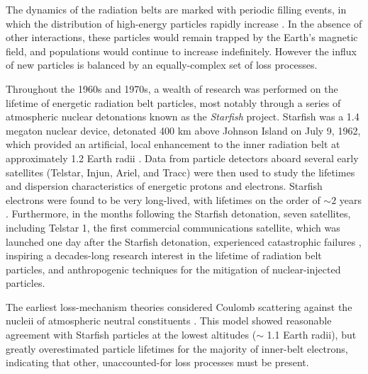 The dynamics of the radiation belts are marked with periodic filling events, in which the distribution of high-energy particles rapidly increase \citep{Horne2005, Baker2014}. In the absence of other interactions, these particles would remain trapped by the Earth's magnetic field, and populations would continue to increase indefinitely. However the influx of new particles is balanced by an equally-complex set of loss processes.

Throughout the 1960s and 1970s, a wealth of research was performed on the lifetime of energetic radiation belt particles, most notably through a series of atmospheric nuclear detonations known as the \emph{Starfish} project\footnotemark. Starfish was a 1.4 megaton nuclear device, detonated 400 km above Johnson Island on July 9, 1962, which provided an artificial, local enhancement to the inner radiation belt at approximately 1.2 Earth radii \citep{Hess1963}. Data from particle detectors aboard several early satellites (Telstar, Injun, Ariel, and Tracc) were then used to study the lifetimes and dispersion characteristics of energetic protons and electrons. Starfish electrons were found to be very long-lived, with lifetimes on the order of $\sim 2$ years \citep{Beall1967}. Furthermore, in the months following the Starfish detonation, seven satellites, including Telstar 1, the first commercial communications satellite, which was launched one day after the Starfish detonation, experienced catastrophic failures \citep{Wenaas1978, Barth2003, Conrad2010}, inspiring a decades-long research interest in the lifetime of radiation belt particles, and anthropogenic techniques for the mitigation of nuclear-injected particles.

The earliest loss-mechanism theories considered Coulomb scattering against the nucleii of atmospheric neutral constituents \citep{Walt1964}. This model showed reasonable agreement with Starfish particles at the lowest altitudes ($\sim$ 1.1 Earth radii), but greatly overestimated particle lifetimes for the majority of inner-belt electrons, indicating that other, unaccounted-for loss processes must be present. 


